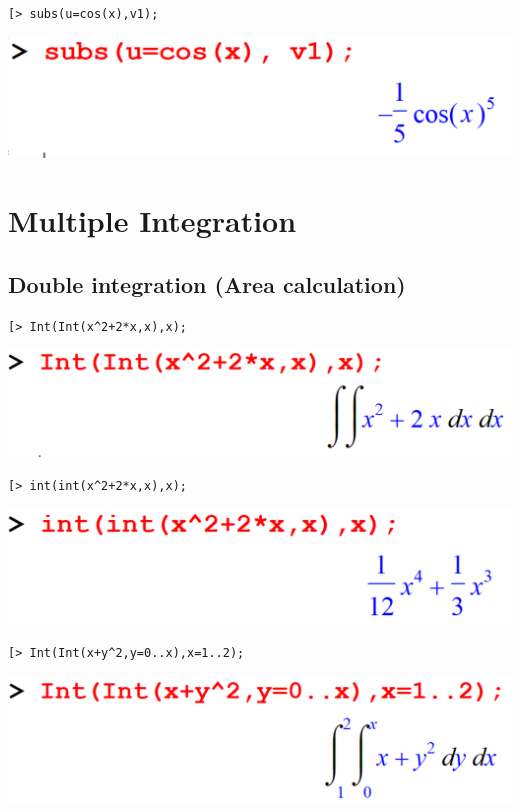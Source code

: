 \documentclass[
]{book}
\theoremstyle{definition}
\theoremstyle{definition}
\theoremstyle{definition}
\theoremstyle{definition}
\theoremstyle{remark}
\begin{document}
\begin{verbatim}
[> subs(u=cos(x),v1);
\end{verbatim}

\includegraphics{figures/Lesson 6/fig18.png}

\section{Multiple Integration}\label{multiple-integration}

\subsection{Double integration (Area calculation)}\label{double-integration-area-calculation}

\begin{verbatim}
[> Int(Int(x^2+2*x,x),x);
\end{verbatim}

\includegraphics{figures/Lesson 6/fig19.png}

\begin{verbatim}
[> int(int(x^2+2*x,x),x);
\end{verbatim}

\includegraphics{figures/Lesson 6/fig20.png}

\begin{verbatim}
[> Int(Int(x+y^2,y=0..x),x=1..2);
\end{verbatim}

\includegraphics{figures/Lesson 6/fig21.png}
\end{document}
